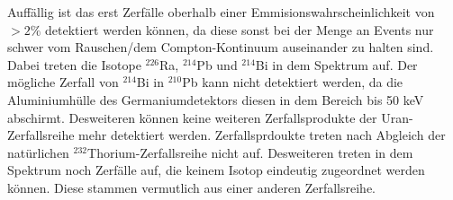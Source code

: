 Auffällig ist das erst Zerfälle oberhalb einer Emmisionswahrscheinlichkeit von $>2\%$ detektiert werden können, da diese sonst bei der Menge an Events nur schwer vom Rauschen/dem Compton-Kontinuum auseinander zu halten sind. Dabei treten die Isotope $^{226}$Ra, $^{214}$Pb und $^{214}$Bi in dem Spektrum auf. Der mögliche Zerfall von $^{214}$Bi in $^{210}$Pb kann nicht detektiert werden, da die Aluminiumhülle des Germaniumdetektors diesen in dem Bereich bis 50 keV abschirmt. Desweiteren können keine weiteren Zerfallsprodukte der Uran-Zerfallsreihe mehr detektiert werden. Zerfallsprdoukte treten nach Abgleich der natürlichen $^{232}$Thorium-Zerfallsreihe \cite{V18} nicht auf.
Desweiteren treten in dem Spektrum noch Zerfälle auf, die keinem Isotop eindeutig zugeordnet werden können. Diese stammen vermutlich aus einer anderen Zerfallsreihe.
